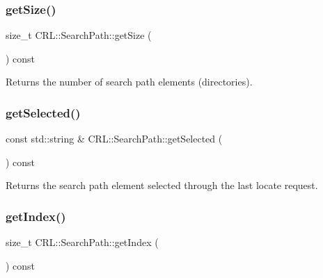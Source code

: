 \subsubsection{\texorpdfstring{get\+Size()}{getSize()}}
{\footnotesize\ttfamily size\+\_\+t C\+R\+L\+::\+Search\+Path\+::get\+Size (\begin{DoxyParamCaption}{ }\end{DoxyParamCaption}) const\hspace{0.3cm}{\ttfamily [inline]}}

\begin{DoxyReturn}{Returns}
the number of search path elements (directories). 
\end{DoxyReturn}
\mbox{\label{classCRL_1_1SearchPath_a1571b1b80eca0da7333a014044158b6f}} 
\subsubsection{\texorpdfstring{get\+Selected()}{getSelected()}}
{\footnotesize\ttfamily const std\+::string \& C\+R\+L\+::\+Search\+Path\+::get\+Selected (\begin{DoxyParamCaption}{ }\end{DoxyParamCaption}) const\hspace{0.3cm}{\ttfamily [inline]}}

\begin{DoxyReturn}{Returns}
the search path element selected through the last locate request. 
\end{DoxyReturn}
\mbox{\label{classCRL_1_1SearchPath_aa1023cd4721778d12756850a57f6a530}} 
\subsubsection{\texorpdfstring{get\+Index()}{getIndex()}}
{\footnotesize\ttfamily size\+\_\+t C\+R\+L\+::\+Search\+Path\+::get\+Index (\begin{DoxyParamCaption}{ }\end{DoxyParamCaption}) const\hspace{0.3cm}{\ttfamily [inline]}}

